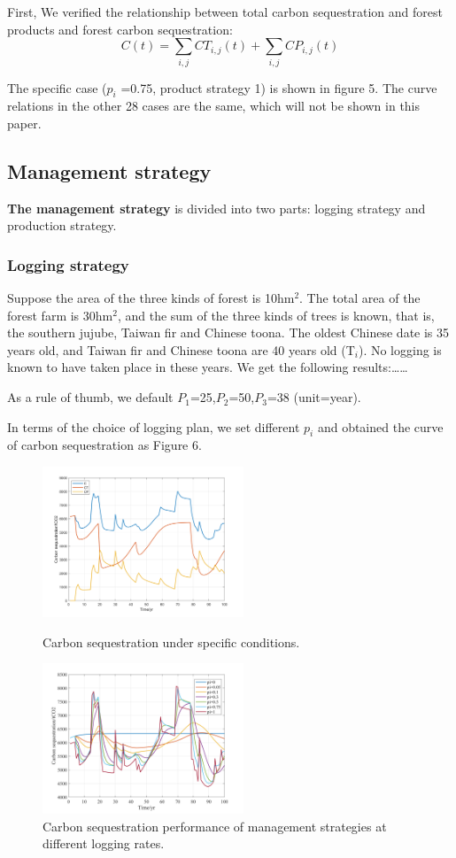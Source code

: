First, We verified the relationship between total carbon sequestration and forest products and forest carbon sequestration:
$$
C(t)=\sum_{i,j}CT_{i,j}(t)+\sum_{i,j}CP_{i,j}(t)
$$

The specific case ($p_i$ =0.75, product strategy 1) is shown in figure 5. The curve relations in the other 28 cases are the same, which will not be shown in this paper.

\subsection{Management strategy}

\textbf{The management strategy} is divided into two parts: logging strategy and production strategy.

\subsubsection{Logging strategy}

Suppose the area of the three kinds of forest is 10hm$^2$. The total area of the forest farm is 30hm$^2$, and the sum of the three kinds of trees is known, that is, the southern jujube, Taiwan fir and Chinese toona. The oldest Chinese date is 35 years old, and Taiwan fir and Chinese toona are 40 years old (T$_i$). No logging is known to have taken place in these years. We get the following results:……

As a rule of thumb, we default $P_1$=25,$P_2$=50,$P_3$=38 (unit=year).

In terms of the choice of logging plan, we set different $p_i$ and obtained the curve of carbon sequestration as Figure $6$.
\begin{figure}[htbp]
\centering
\begin{minipage}[t]{0.48\textwidth}
\centering
\includegraphics[width=6cm]{figs/CS.png}
\caption{Carbon sequestration under specific conditions.}
\end{minipage}
\begin{minipage}[t]{0.48\textwidth}
\centering
\includegraphics[width=6cm]{figs/pi_s.png}
\caption{Carbon sequestration performance of management strategies at different logging rates.}
\end{minipage}
\end{figure}

